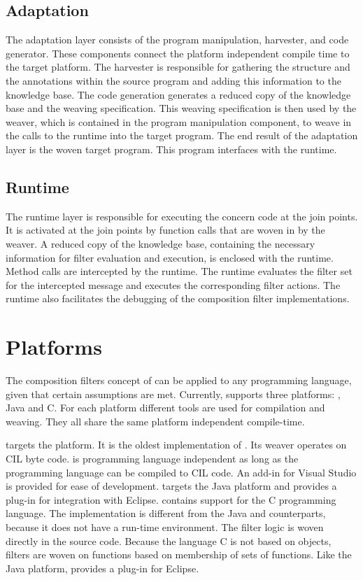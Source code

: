 \subsection{Adaptation}
The adaptation layer consists of the program manipulation, harvester, and code generator.
These components connect the platform independent compile time to the target platform.
The harvester is responsible for gathering the structure and the annotations within the source program and adding this information to the knowledge base.
The code generation generates a reduced copy of the knowledge base and the weaving specification.
This weaving specification is then used by the weaver, which is contained in the program manipulation component, to weave in the calls to the runtime into the target program.
The end result of the adaptation layer is the woven target program. This program interfaces with the runtime.

\subsection{Runtime}
The runtime layer is responsible for executing the concern code at the join points.
It is activated at the join points by function calls that are woven in by the weaver.
A reduced copy of the knowledge base, containing the necessary information for filter evaluation and execution, is enclosed with the runtime.
Method calls are intercepted by the runtime. The runtime evaluates the filter set for the intercepted message and executes the corresponding filter actions.
The runtime also facilitates the debugging of the composition filter implementations.

\section{Platforms}
The composition filters concept of \Compose* can be applied to any programming language, given that certain assumptions are met.
Currently, \Compose* supports three platforms: \dotNET, Java and C\@.
For each platform different tools are used for compilation and weaving.
They all share the same platform independent compile-time.

\Compose*[.NET] targets the \dotNET platform. It is the oldest implementation of \Compose*.
Its weaver operates on CIL byte code.
\Compose*[.NET] is programming language independent as long as the programming language can be compiled to CIL code.
An add-in for Visual Studio is provided for ease of development.
\Compose*[J] targets the Java platform and provides a plug-in for integration with Eclipse.
\Compose*[C] contains support for the C programming language.
The implementation is different from the Java and \dotNET counterparts, because it does not have a run-time environment.
The filter logic is woven directly in the source code.
Because the language C is not based on objects, filters are woven on functions based on membership of sets of functions.
Like the Java platform, \Compose*[C] provides a plug-in for Eclipse.